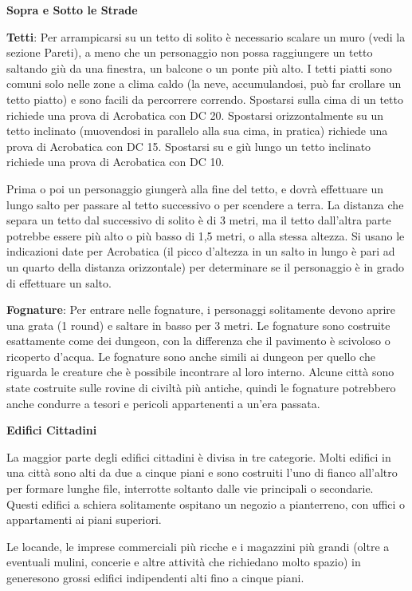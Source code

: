 \documentclass[a4paper,11pt,twoside,openany]{book}
\begin{document}
{\textbf{Sopra e Sotto le Strade}

\textbf{Tetti}: Per arrampicarsi su un tetto di solito è necessario scalare un muro (vedi la sezione Pareti), a meno che un personaggio non possa raggiungere un tetto saltando giù da una finestra, un balcone o un ponte più alto. I tetti piatti sono comuni solo nelle zone a clima caldo (la neve, accumulandosi, può far crollare un tetto piatto) e sono facili da percorrere correndo. Spostarsi sulla cima di un tetto richiede una prova di Acrobatica con DC 20. Spostarsi orizzontalmente su un tetto inclinato (muovendosi in parallelo alla sua cima, in pratica) richiede una prova di Acrobatica con DC 15. Spostarsi su e giù lungo un tetto inclinato richiede una prova di Acrobatica con DC 10.

Prima o poi un personaggio giungerà alla fine del tetto, e dovrà effettuare un lungo salto per passare al tetto successivo o per scendere a terra. La distanza che separa un tetto dal successivo di solito è di 3 metri, ma il tetto dall'altra parte potrebbe essere più alto o più basso di 1,5 metri, o alla stessa altezza. Si usano le indicazioni date per Acrobatica (il picco d'altezza in un salto in lungo è pari ad un quarto della distanza orizzontale) per determinare se il personaggio è in grado di effettuare un salto.

\textbf{Fognature}: Per entrare nelle fognature, i personaggi solitamente devono aprire una grata (1 round) e saltare in basso per 3 metri. Le fognature sono costruite esattamente come dei dungeon, con la differenza che il pavimento è scivoloso o ricoperto d'acqua. Le fognature sono anche simili ai dungeon per quello che riguarda le creature che è possibile incontrare al loro interno. Alcune città sono state costruite sulle rovine di civiltà più antiche, quindi le fognature potrebbero anche condurre a tesori e pericoli appartenenti a un'era passata.

\textbf{Edifici Cittadini}

La maggior parte degli edifici cittadini è divisa in tre categorie. Molti edifici in una città sono alti da due a cinque piani e sono costruiti l'uno di fianco all'altro per formare lunghe file, interrotte soltanto dalle vie principali o secondarie. Questi edifici a schiera solitamente ospitano un negozio a pianterreno, con uffici o appartamenti ai piani superiori.

Le locande, le imprese commerciali più ricche e i magazzini più grandi (oltre a eventuali mulini, concerie e altre attività che richiedano molto spazio) in generesono grossi edifici indipendenti alti fino a cinque piani.

}
\end{document}
